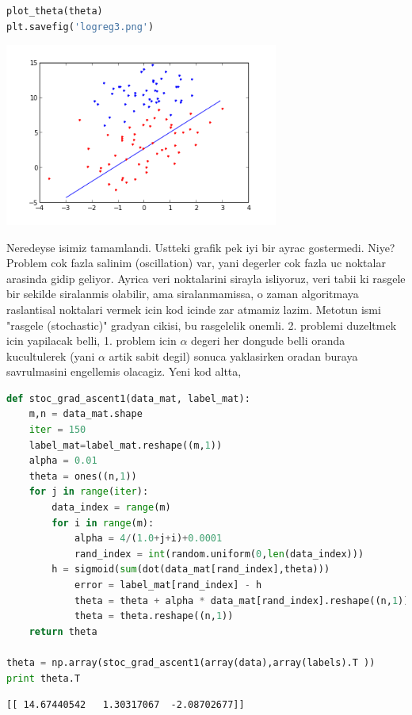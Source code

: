 \documentclass[12pt,fleqn]{article}\usepackage{../common}
\begin{document}
\begin{lstlisting}[language=Python]
plot_theta(theta)
plt.savefig('logreg3.png')
\end{lstlisting}

\includegraphics[height=6cm]{logreg3.png}

Neredeyse isimiz tamamlandi. Ustteki grafik pek iyi bir ayrac gostermedi.
Niye? Problem cok fazla salinim (oscillation) var, yani degerler cok fazla
uc noktalar arasinda gidip geliyor. Ayrica veri noktalarini sirayla isliyoruz,
veri tabii ki rasgele bir sekilde siralanmis olabilir, ama siralanmamissa,
o zaman algoritmaya raslantisal noktalari vermek icin kod icinde zar atmamiz
lazim. Metotun ismi "rasgele (stochastic)" gradyan cikisi, bu rasgelelik
onemli. 2. problemi duzeltmek icin yapilacak belli, 1. problem icin
$\alpha$ degeri her dongude belli oranda kucultulerek (yani $\alpha$ artik
sabit degil) sonuca yaklasirken oradan buraya savrulmasini engellemis
olacagiz. Yeni kod altta,

\begin{lstlisting}[language=Python]
def stoc_grad_ascent1(data_mat, label_mat):
    m,n = data_mat.shape
    iter = 150
    label_mat=label_mat.reshape((m,1))
    alpha = 0.01
    theta = ones((n,1))
    for j in range(iter):
        data_index = range(m)
        for i in range(m):
            alpha = 4/(1.0+j+i)+0.0001  
            rand_index = int(random.uniform(0,len(data_index)))
	    h = sigmoid(sum(dot(data_mat[rand_index],theta)))
            error = label_mat[rand_index] - h
            theta = theta + alpha * data_mat[rand_index].reshape((n,1)) * error
            theta = theta.reshape((n,1))
    return theta

theta = np.array(stoc_grad_ascent1(array(data),array(labels).T ))
print theta.T
\end{lstlisting}

\begin{verbatim}
[[ 14.67440542   1.30317067  -2.08702677]]
\end{verbatim}
\end{document}
